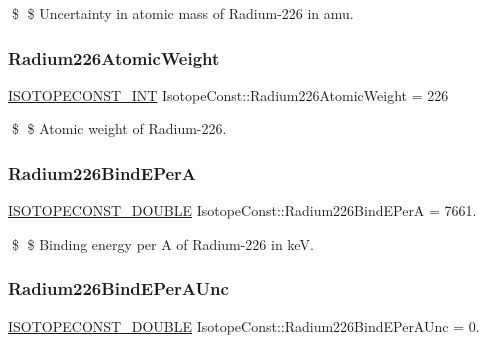 \$ \$ Uncertainty in atomic mass of Radium-\/226 in amu. \mbox{\label{group___isotope_const-_radium-_ra226_ga6788ab141d7a88581b6284d15e6d8497}} 
\subsubsection{\texorpdfstring{Radium226\+Atomic\+Weight}{Radium226AtomicWeight}}
{\footnotesize\ttfamily \mbox{\hyperlink{group___isotope_const-_macros_ga5f18360b3e99483a35c32d789e62621c}{I\+S\+O\+T\+O\+P\+E\+C\+O\+N\+S\+T\+\_\+\+I\+NT}} Isotope\+Const\+::\+Radium226\+Atomic\+Weight = 226}

\$ \$ Atomic weight of Radium-\/226. \mbox{\label{group___isotope_const-_radium-_ra226_gaedca8e6eeb898ed954f325cf51276d07}} 
\subsubsection{\texorpdfstring{Radium226\+Bind\+E\+PerA}{Radium226BindEPerA}}
{\footnotesize\ttfamily \mbox{\hyperlink{group___isotope_const-_macros_ga8f45a7272ce02c0b4c65c44636ed719a}{I\+S\+O\+T\+O\+P\+E\+C\+O\+N\+S\+T\+\_\+\+D\+O\+U\+B\+LE}} Isotope\+Const\+::\+Radium226\+Bind\+E\+PerA = 7661.}

\$ \$ Binding energy per A of Radium-\/226 in keV. \mbox{\label{group___isotope_const-_radium-_ra226_gaa059533ba2c1260658ad120322c684a1}} 
\subsubsection{\texorpdfstring{Radium226\+Bind\+E\+Per\+A\+Unc}{Radium226BindEPerAUnc}}
{\footnotesize\ttfamily \mbox{\hyperlink{group___isotope_const-_macros_ga8f45a7272ce02c0b4c65c44636ed719a}{I\+S\+O\+T\+O\+P\+E\+C\+O\+N\+S\+T\+\_\+\+D\+O\+U\+B\+LE}} Isotope\+Const\+::\+Radium226\+Bind\+E\+Per\+A\+Unc = 0.}

